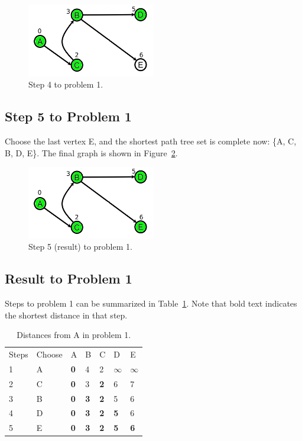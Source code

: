 \documentclass[doc,natbib,12pt]{article}
\begin{document}
	\begin{figure}[htpb]
		\centering
		\includegraphics[width=0.5\textwidth]{1-4.png}
		\caption{\label{fig:problem1-step4}Step 4 to problem 1.}
	\end{figure}
	
	\subsection*{Step 5 to Problem 1}
	Choose the last vertex E, and the shortest path tree set is complete now: \{A, C, B, D, E\}. The final graph is shown in Figure~\ref{fig:problem1-step5}.
	
	\begin{figure}[htpb]
		\centering
		\includegraphics[width=0.5\textwidth]{1-5.png}
		\caption{\label{fig:problem1-step5}Step 5 (result) to problem 1.}
	\end{figure}
	
	\subsection*{Result to Problem 1}
	Steps to problem 1 can be summarized in Table~\ref{tab:problem1-result}. Note that bold text indicates the shortest distance in that step.
	
	\begin{table}[htpb]
		\centering
		\begin{tabular}{lllllll}
			Steps & Choose                 & A & B & C & D    & E    \\ \cline{1-7} 
			1 & \multicolumn{1}{l|}{A} & \textbf{0} & 4 & 2 & $\infty$ & $\infty$ \\
			2 & \multicolumn{1}{l|}{C} & \textbf{0} & 3 &\textbf{2} & 6    & 7    \\
			3 & \multicolumn{1}{l|}{B} & \textbf{0} & \textbf{3} & \textbf{2} & 5   & 6    \\
			4 & \multicolumn{1}{l|}{D} & \textbf{0} & \textbf{3} & \textbf{2} & \textbf{5}   &  6 \\
			5 & \multicolumn{1}{l|}{E} & \textbf{0} & \textbf{3} & \textbf{2} & \textbf{5}   &  \textbf{6}
		\end{tabular}
		\caption{\label{tab:problem1-result}Distances from A in problem 1.}
	\end{table}
	
\end{document}
